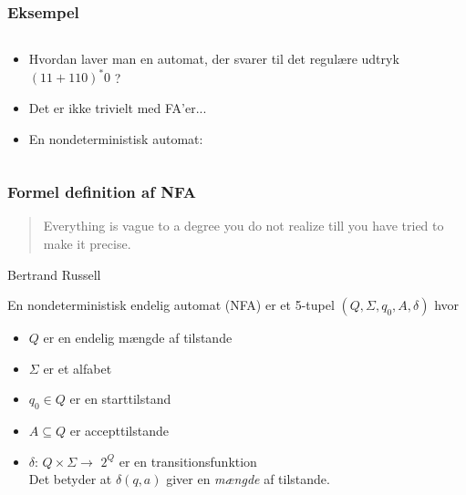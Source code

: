 \begin{frame}
\frametitle{Eksempel}

\begin{columns}
  \begin{column}{9cm}
    \begin{itemize}[<+->]
    \item Hvordan laver man en automat, der svarer til det regulære
      udtryk $(11 + 110)^*0$ ?

    \item Det er ikke trivielt med FA’er...

    \item En nondeterministisk automat:
    \end{itemize}
  \end{column}
  \begin{column}{5cm}
  \end{column}
\end{columns}
\end{frame}
\begin{frame}
\frametitle{Formel definition af NFA}
\begin{verse}
Everything is vague to a degree you do not realize till you have tried to make it precise.
\end{verse}
    Bertrand Russell

    \bigskip  

\pause
En nondeterministisk endelig automat (NFA) er et 5-tupel $(Q, \Sigma, q_0, A, \delta)$ hvor
 
\begin{itemize}[<+->]
\item $Q$ er en endelig mængde af tilstande
\item $\Sigma$ er et alfabet
\item $q_0\in Q$ er en starttilstand
\item $A\subseteq Q$ er accepttilstande
\item $\delta$: $Q\times \Sigma \rightarrow$ \alert{$2^Q$} er en transitionsfunktion\\
  Det betyder at $\delta(q,a)$ giver en \emph{mængde} af tilstande.
\end{itemize}
\end{frame}

